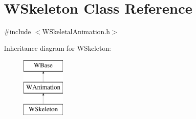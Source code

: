 \hypertarget{class_w_skeleton}{}\section{W\+Skeleton Class Reference}
\label{class_w_skeleton}


{\ttfamily \#include $<$W\+Skeletal\+Animation.\+h$>$}

Inheritance diagram for W\+Skeleton\+:\begin{figure}[H]
\begin{center}
\leavevmode
\includegraphics[height=3.000000cm]{class_w_skeleton}
\end{center}
\end{figure}
